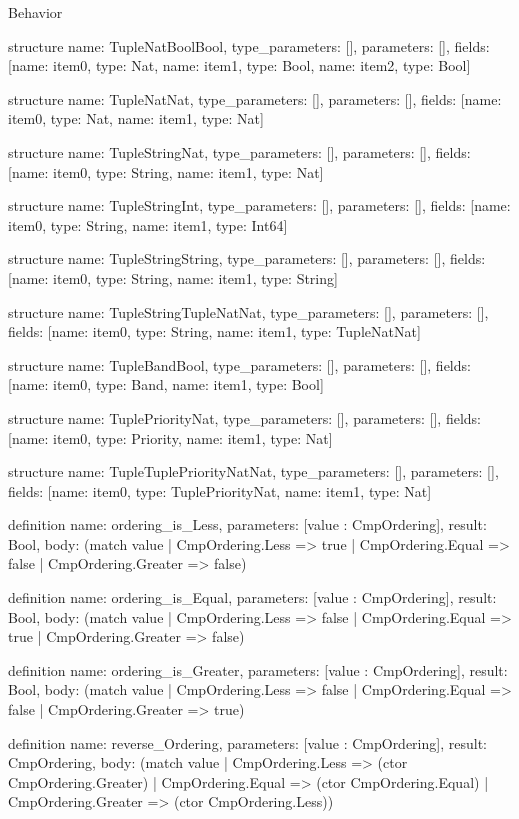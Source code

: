 \begin{lexlean}{Behavior}
\begin{semanticmodule}
structure{
  name: TupleNatBoolBool,
  type_parameters: [],
  parameters: [],
  fields: [{name: item0, type: Nat}, {name: item1, type: Bool}, {name: item2, type: Bool}]
}

structure{
  name: TupleNatNat,
  type_parameters: [],
  parameters: [],
  fields: [{name: item0, type: Nat}, {name: item1, type: Nat}]
}

structure{
  name: TupleStringNat,
  type_parameters: [],
  parameters: [],
  fields: [{name: item0, type: String}, {name: item1, type: Nat}]
}

structure{
  name: TupleStringInt,
  type_parameters: [],
  parameters: [],
  fields: [{name: item0, type: String}, {name: item1, type: Int64}]
}

structure{
  name: TupleStringString,
  type_parameters: [],
  parameters: [],
  fields: [{name: item0, type: String}, {name: item1, type: String}]
}

structure{
  name: TupleStringTupleNatNat,
  type_parameters: [],
  parameters: [],
  fields: [{name: item0, type: String}, {name: item1, type: TupleNatNat}]
}

structure{
  name: TupleBandBool,
  type_parameters: [],
  parameters: [],
  fields: [{name: item0, type: Band}, {name: item1, type: Bool}]
}

structure{
  name: TuplePriorityNat,
  type_parameters: [],
  parameters: [],
  fields: [{name: item0, type: Priority}, {name: item1, type: Nat}]
}

structure{
  name: TupleTuplePriorityNatNat,
  type_parameters: [],
  parameters: [],
  fields: [{name: item0, type: TuplePriorityNat}, {name: item1, type: Nat}]
}

definition{
  name: ordering_is_Less,
  parameters: [value : CmpOrdering],
  result: Bool,
  body: (match value
    | CmpOrdering.Less => true
    | CmpOrdering.Equal => false
    | CmpOrdering.Greater => false)
}

definition{
  name: ordering_is_Equal,
  parameters: [value : CmpOrdering],
  result: Bool,
  body: (match value
    | CmpOrdering.Less => false
    | CmpOrdering.Equal => true
    | CmpOrdering.Greater => false)
}

definition{
  name: ordering_is_Greater,
  parameters: [value : CmpOrdering],
  result: Bool,
  body: (match value
    | CmpOrdering.Less => false
    | CmpOrdering.Equal => false
    | CmpOrdering.Greater => true)
}

definition{
  name: reverse_Ordering,
  parameters: [value : CmpOrdering],
  result: CmpOrdering,
  body: (match value
    | CmpOrdering.Less => (ctor CmpOrdering.Greater)
    | CmpOrdering.Equal => (ctor CmpOrdering.Equal)
    | CmpOrdering.Greater => (ctor CmpOrdering.Less))
}


\end{semanticmodule}
\end{lexlean}
